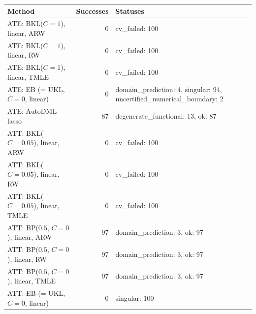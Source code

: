 \begin{tabular}{lrl}
\hline
Method & Successes & Statuses \\
\hline
ATE: BKL($C=1$), linear, ARW & 0 & cv\_failed: 100 \\
ATE: BKL($C=1$), linear, RW & 0 & cv\_failed: 100 \\
ATE: BKL($C=1$), linear, TMLE & 0 & cv\_failed: 100 \\
ATE: EB (= UKL, $C=0$, linear) & 0 & domain\_prediction: 4, singular: 94, uncertified\_numerical\_boundary: 2 \\
ATE: AutoDML-lasso & 87 & degenerate\_functional: 13, ok: 87 \\
ATT: BKL($C=0.05$), linear, ARW & 0 & cv\_failed: 100 \\
ATT: BKL($C=0.05$), linear, RW & 0 & cv\_failed: 100 \\
ATT: BKL($C=0.05$), linear, TMLE & 0 & cv\_failed: 100 \\
ATT: BP($0.5$, $C=0$), linear, ARW & 97 & domain\_prediction: 3, ok: 97 \\
ATT: BP($0.5$, $C=0$), linear, RW & 97 & domain\_prediction: 3, ok: 97 \\
ATT: BP($0.5$, $C=0$), linear, TMLE & 97 & domain\_prediction: 3, ok: 97 \\
ATT: EB (= UKL, $C=0$, linear) & 0 & singular: 100 \\
\hline
\end{tabular}

